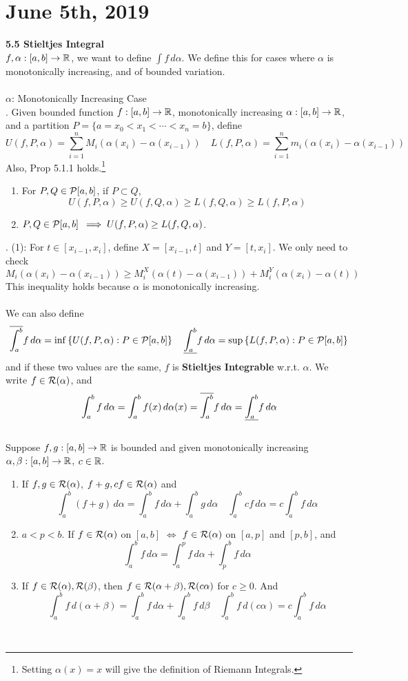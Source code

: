 \section*{June 5th, 2019}
\textbf{5.5 Stieltjes Integral}\\
$f, \alpha:[a, b]\rightarrow\mathbb{R}$, we want to define $ \int f \,d\alpha$. We define this for cases where $\alpha$ is monotonically increasing, and of bounded variation.\\
\\
$\alpha$: Monotonically Increasing Case\\
. Given bounded function $f:[a, b]\rightarrow\mathbb{R}$, monotonically increasing $\alpha:[a, b]\rightarrow\mathbb{R}$, and a partition $P = \{a=x_0<x_1<\cdots<x_n=b  \}$, define
$$U(f, P, \alpha) = \sum_{i=1}^n M_i (\alpha(x_i) - \alpha(x_{i-1})) \quad L(f, P, \alpha) = \sum_{i=1}^n m_i (\alpha(x_i) - \alpha(x_{i-1}))$$
Also, Prop 5.1.1 holds.\footnote{Setting $\alpha(x) = x$ will give the definition of Riemann Integrals.}
\begin{enumerate}
	\item For $P, Q\in \mathcal{P}[a, b]$, if $P\subset Q$,
	$$ U(f, P, \alpha) \geq U(f, Q, \alpha) \geq L(f, Q, \alpha) \geq L(f, P, \alpha) $$
	\item $P, Q\in \mathcal{P}[a, b]$ $ \implies U(f, P, \alpha) \geq L(f, Q, \alpha)$.
\end{enumerate}
\pf. (1): For $t\in [x_{i-1}, x_i]$, define $X = [x_{i-1}, t]$ and $Y = [t, x_i]$. We only need to check $$M_i (\alpha(x_i)-\alpha(x_{i-1})) \geq M_{i}^X(\alpha(t) - \alpha(x_{i-1})) + M_{i}^Y(\alpha(x_{i}) - \alpha(t))$$
This inequality holds because $\alpha$ is monotonically increasing.\\
\\
We can also define
$$\overline{\int_a^b}f\,d\alpha = \inf\left\{ U(f, P, \alpha): P\in\mathcal{P}[a, b] \right\} \quad \underline{\int_a^b}f\,d\alpha = \sup\left\{ L(f, P, \alpha): P\in\mathcal{P}[a, b] \right\} $$
and if these two values are the same, $f$ is \textbf{Stieltjes Integrable} w.r.t. $\alpha$. We write $f\in \mathcal{R}(\alpha)$, and $$\int_a^b f\,d\alpha = \int_a^b f(x)\,d\alpha(x) = \overline{\int_a^b}f\,d\alpha = \underline{\int_a^b}f\,d\alpha $$
\\
 Suppose $f, g:[a, b]\rightarrow\mathbb{R}$ is bounded and given monotonically increasing $\alpha, \beta:[a, b]\rightarrow\mathbb{R}$, $c\in \mathbb{R}$.
\begin{enumerate}
	\item If $f, g \in \mathcal{R}(\alpha)$, $f+g, cf \in \mathcal{R}(\alpha)$ and $$\int_a^b (f+g)\, d\alpha = \int_a^b f\,d\alpha + \int_a^b g\,d\alpha \quad \int_a^b cf\,d\alpha = c\int_a^b f\,d\alpha$$	\item $a<p<b$. If $f\in \mathcal{R}(\alpha)$ on $[a, b]$ $\iff$ $f\in \mathcal{R}(\alpha)$ on $[a, p]$ and $[p, b]$, and
	$$\int_a^b f\,d\alpha = \int_a^p f\,d\alpha + \int_p^b f\,d\alpha$$
	\item If $f\in \mathcal{R}(\alpha), \mathcal{R}(\beta)$, then $f\in \mathcal{R}(\alpha + \beta), \mathcal{R}(c\alpha)$ for $c\geq0$. And
	$$\int_a^b f\, d(\alpha+\beta) = \int_a^b f\,d\alpha + \int_a^b f\,d\beta\quad \int_a^b f\, d(c\alpha) = c\int_a^b f\,d\alpha$$
\end{enumerate}~\\
